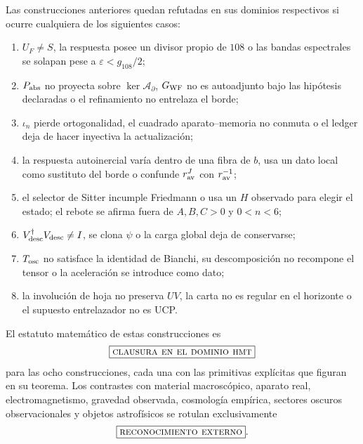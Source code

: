Las construcciones anteriores quedan refutadas en sus dominios respectivos
si ocurre cualquiera de los siguientes casos:

\begin{enumerate}
 \setlength{\itemsep}{0.15\baselineskip}
 \item \(U_F\neq S\), la respuesta posee un divisor propio de \(108\) o las
 bandas espectrales se solapan pese a \(\varepsilon<g_{108}/2\);
 \item \(P_{\rm abs}\) no proyecta sobre
 \(\ker\mathcal A_\partial\), \(G_{\rm WF}\) no es autoadjunto bajo las
 hipótesis declaradas o el refinamiento no entrelaza el borde;
 \item \(\iota_n\) pierde ortogonalidad, el cuadrado aparato--memoria no
 conmuta o el ledger deja de hacer inyectiva la actualización;
 \item la respuesta autoinercial varía dentro de una fibra de \(b\), usa un
 dato local como sustituto del borde o confunde
 \(r_{\rm av}^J\) con \(r_{\rm av}^{-1}\);
 \item el selector de Sitter incumple Friedmann o usa un \(H\) observado
 para elegir el estado; el rebote se afirma fuera de
 \(A,B,C>0\) y \(0<n<6\);
 \item \(V_{\rm desc}^{\dagger}V_{\rm desc}\neq I\), se clona \(\psi\) o
 la carga global deja de conservarse;
 \item \(T_{\rm osc}\) no satisface la identidad de Bianchi, su
 descomposición no recompone el tensor o la aceleración se introduce como
 dato;
 \item la involución de hoja no preserva \(UV\), la carta no es regular en
 el horizonte o el supuesto entrelazador no es UCP.
\end{enumerate}


El estatuto matemático de estas construcciones es
\[
 \boxed{\textsc{clausura en el dominio hmt}}
\]
para las ocho construcciones, cada una con las primitivas explícitas que
figuran en su teorema. Los contrastes con material macroscópico, aparato
real, electromagnetismo, gravedad observada, cosmología empírica, sectores
oscuros observacionales y objetos astrofísicos se rotulan exclusivamente
\[
 \boxed{\textsc{reconocimiento externo}}.
\]
